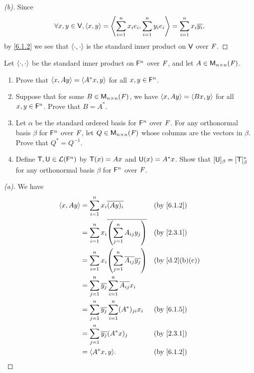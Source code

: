 \begin{proof}[(b)]
  Since
  \[
    \forall x, y \in \mathsf{V}, \left\langle x, y\right\rangle = \left\langle\sum_{i = 1}^n x_i e_i, \sum_{i = 1}^n y_i e_i\right\rangle = \sum_{i = 1}^n x_i \overline{y_i},
  \]
  by \cref{6.1.2} we see that \(\left\langle\cdot, \cdot\right\rangle\) is the standard inner product on \(\mathsf{V}\) over \(\mathit{F}\).
\end{proof}

\begin{ex}\label{ex:6.1.23}
  Let \(\left\langle\cdot, \cdot\right\rangle\) be the standard inner product on \(\mathsf{F}^n\) over \(\mathit{F}\), and let \(A \in \mathsf{M}_{{n} \times n}({\mathit{F}})\).
  \begin{enumerate}
    \item Prove that \(\left\langle x, Ay\right\rangle = \left\langle A^* x, y\right\rangle\) for all \(x, y \in \mathsf{F}^n\).
    \item Suppose that for some \(B \in \mathsf{M}_{{n} \times n}({\mathit{F}})\), we have \(\left\langle x, Ay\right\rangle = \left\langle Bx, y\right\rangle\) for all \(x, y \in \mathsf{F}^n\).
          Prove that \(B = A^*\).
    \item Let \(\alpha\) be the standard ordered basis for \(\mathsf{F}^n\) over \(\mathit{F}\).
          For any orthonormal basis \(\beta\) for \(\mathsf{F}^n\) over \(\mathit{F}\), let \(Q \in \mathsf{M}_{{n} \times n}({\mathit{F}})\) whose columns are the vectors in \(\beta\).
          Prove that \(Q^* = Q^{-1}\).
    \item Define \(\mathsf{T}, \mathsf{U} \in \mathcal{L}(\mathsf{F}^n)\) by \(\mathsf{T}(x) = Ax\) and \(\mathsf{U}(x) = A^* x\).
          Show that \([\mathsf{U}]_{\beta} = [\mathsf{T}]_{\beta}^*\) for any orthonormal basis \(\beta\) for \(\mathsf{F}^n\) over \(\mathit{F}\).
  \end{enumerate}
\end{ex}

\begin{proof}[(a)]
  We have
  \begin{align*}
    \inn{x, Ay} & = \sum_{i = 1}^n x_i \conj{(Ay)_i}                                 &  & \text{(by \cref{6.1.2})}     \\
                & = \sum_{i = 1}^n x_i \conj{\pa{\sum_{j = 1}^n A_{i j} y_j}}        &  & \text{(by \cref{2.3.1})}     \\
                & = \sum_{i = 1}^n x_i \pa{\sum_{j = 1}^n \conj{A_{i j}} \conj{y_j}} &  & \text{(by \cref{d.2}(b)(c))} \\
                & = \sum_{j = 1}^n \conj{y_j} \sum_{i = 1}^n \conj{A_{i j}} x_i                                        \\
                & = \sum_{j = 1}^n \conj{y_j} \sum_{i = 1}^n (A^*)_{j i} x_i         &  & \text{(by \cref{6.1.5})}     \\
                & = \sum_{j = 1}^n \conj{y_j} (A^* x)_j                              &  & \text{(by \cref{2.3.1})}     \\
                & = \inn{A^* x, y}.                                                  &  & \text{(by \cref{6.1.2})}
  \end{align*}
\end{proof}

